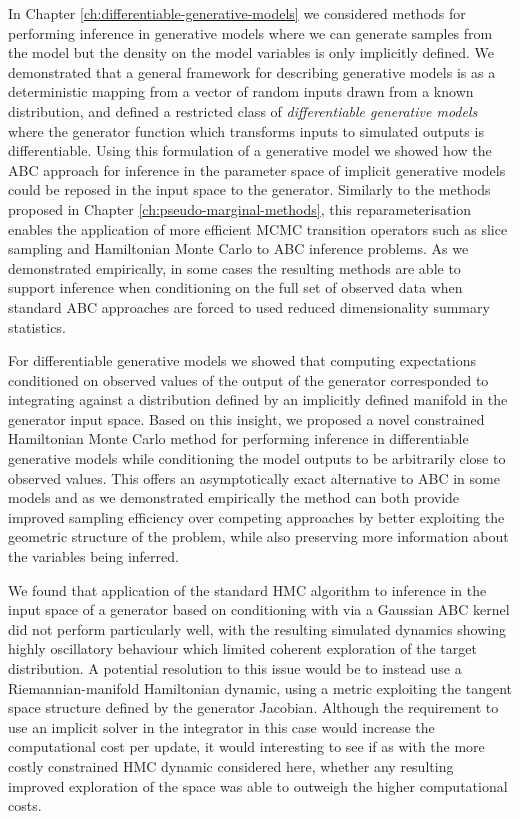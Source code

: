 In Chapter \ref{ch:differentiable-generative-models} we considered methods for performing inference in generative models where we can generate samples from the model but the density on the model variables is only implicitly defined. We demonstrated that a general framework for describing generative models is as a deterministic mapping from a vector of random inputs drawn from a known distribution, and defined a restricted class of \emph{differentiable generative models} where the generator function which transforms inputs to simulated outputs is differentiable. Using this formulation of a generative model we showed how the \acf{ABC} approach for inference in the parameter space of implicit generative models could be reposed in the input space to the generator. Similarly to the methods proposed in Chapter \ref{ch:pseudo-marginal-methods}, this reparameterisation enables the application of more efficient \ac{MCMC} transition operators such as slice sampling and Hamiltonian Monte Carlo to \ac{ABC} inference problems. As we demonstrated empirically, in some cases the resulting methods are able to support inference when conditioning on the full set of observed data when standard \ac{ABC} approaches are forced to used reduced dimensionality summary statistics.

For differentiable generative models we showed that computing expectations conditioned on observed values of the output of the generator corresponded to integrating against a distribution defined by an implicitly defined manifold in the generator input space. Based on this insight, we proposed a novel constrained Hamiltonian Monte Carlo method for performing inference in differentiable generative models while conditioning the model outputs to be arbitrarily close to observed values. This offers an asymptotically exact alternative to \ac{ABC} in some models and as we demonstrated empirically the method can both provide improved sampling efficiency over competing approaches by better exploiting the geometric structure of the problem, while also preserving more information about the variables being inferred.

We found that application of the standard \ac{HMC} algorithm to inference in the input space of a generator based on conditioning with via a Gaussian \ac{ABC} kernel did not perform particularly well, with the resulting simulated dynamics showing highly oscillatory behaviour which limited coherent exploration of the target distribution. A potential resolution to this issue would be to instead use a Riemannian-manifold Hamiltonian dynamic, using a metric exploiting the tangent space structure defined by the generator Jacobian. Although the requirement to use an implicit solver in the integrator in this case would increase the computational cost per update, it would interesting to see if as with the more costly constrained \ac{HMC} dynamic considered here, whether any resulting improved exploration of the space was able to outweigh the higher computational costs.

